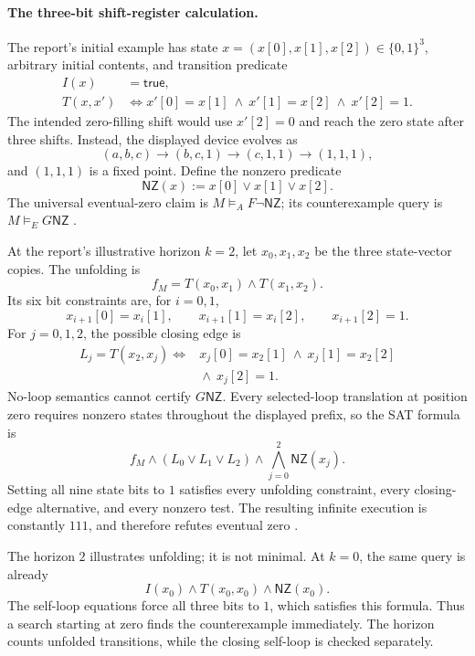 \paragraph{The three-bit shift-register calculation.}
\label{sec:p09-n-c-017-biere-shift-register}
The report's initial example has state
\(x=(x[0],x[1],x[2])\in\{0,1\}^3\), arbitrary initial contents,
and transition predicate
\[
\begin{aligned}
 I(x)&=\mathsf{true},\\
 T(x,x')&\iff
   x'[0]=x[1]\ \land\ x'[1]=x[2]\ \land\ x'[2]=1.
\end{aligned}
\]
The intended zero-filling shift would use \(x'[2]=0\) and
reach the zero state after three shifts. Instead, the displayed
device evolves as
\[
 (a,b,c)\longrightarrow(b,c,1)
 \longrightarrow(c,1,1)\longrightarrow(1,1,1),
\]
and \((1,1,1)\) is a fixed point. Define the nonzero predicate
\[
 \mathsf{NZ}(x):=x[0]\lor x[1]\lor x[2].
\]
The universal eventual-zero claim is
\(M\models_A F\neg\mathsf{NZ}\); its counterexample query
is \(M\models_E G\mathsf{NZ}\)
\cite[\S2 and fig.~1]{BiereCimattiClarkeZhu1999}.

At the report's illustrative horizon \(k=2\), let
\(x_0,x_1,x_2\) be the three state-vector copies. The unfolding is
\[
 f_M=T(x_0,x_1)\land T(x_1,x_2).
\]
Its six bit constraints are, for \(i=0,1\),
\[
 x_{i+1}[0]=x_i[1],\qquad
 x_{i+1}[1]=x_i[2],\qquad x_{i+1}[2]=1.
\]
For \(j=0,1,2\), the possible closing edge is
\[
\begin{split}
 L_j=T(x_2,x_j)\iff{}&
 x_j[0]=x_2[1]\ \land\ x_j[1]=x_2[2]\\
 &{}\land\ x_j[2]=1.
\end{split}
\]
No-loop semantics cannot certify \(G\mathsf{NZ}\). Every
selected-loop translation at position zero requires nonzero
states throughout the displayed prefix, so the SAT formula is
\[
 f_M\land(L_0\lor L_1\lor L_2)
       \land\bigwedge_{j=0}^{2}\mathsf{NZ}(x_j).
\]
Setting all nine state bits to \(1\) satisfies every unfolding
constraint, every closing-edge alternative, and every nonzero
test. The resulting infinite execution is constantly \(111\),
and therefore refutes eventual zero
\cite[\S2, eq.~(1)]{BiereCimattiClarkeZhu1999}.

The horizon \(2\) illustrates unfolding; it is not minimal.
At \(k=0\), the same query is already
\[
 I(x_0)\land T(x_0,x_0)\land\mathsf{NZ}(x_0).
\]
The self-loop equations force all three bits to \(1\), which
satisfies this formula. Thus a search starting at zero finds
the counterexample immediately. The horizon counts unfolded
transitions, while the closing self-loop is checked separately.

